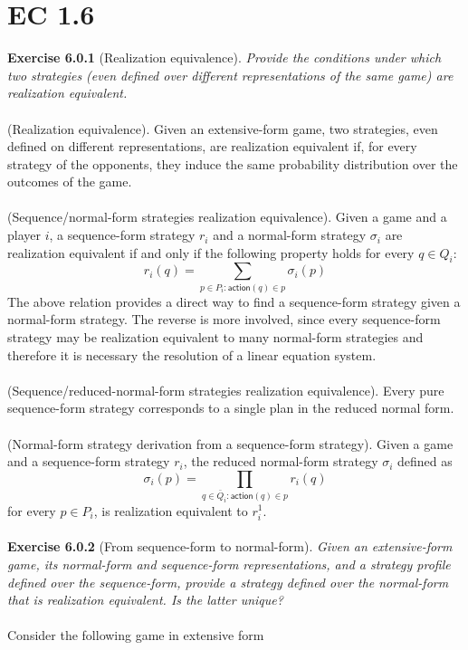 \section{EC 1.6}
\textbf{Exercise 6.0.1} (Realization equivalence). \textit{Provide the conditions under which two strategies (even defined over
different representations of the same game) are realization equivalent.}\\\\
(Realization equivalence). Given an extensive-form game, two strategies, even defined on different
representations, are realization equivalent if, for every strategy of the opponents, they induce the same probability
distribution over the outcomes of the game.\\\\
(Sequence/normal-form strategies realization equivalence). Given a game and a player $i$, a sequence-form strategy $r_i$ and a normal-form strategy $\sigma_i$ are realization equivalent if and only if the following property holds for every $q \in Q_i$:
$$ r_{i}(q) = \sum_{p \in P_i:\mathsf{action}(q) \in p} \sigma_{i}(p) $$
The above relation provides a direct way to find a sequence-form strategy given a normal-form strategy. The reverse is more involved, since every sequence-form strategy may be realization equivalent to many normal-form strategies and therefore it is necessary the resolution of a linear equation system.\\\\
(Sequence/reduced-normal-form strategies realization equivalence). Every pure sequence-form strategy corresponds to a single plan in the reduced normal form.\\\\
(Normal-form strategy derivation from a sequence-form strategy). Given a game and a sequence-form strategy $r_{i}$, the reduced normal-form strategy $\sigma_{i}$ defined as
$$
\sigma_{i}(p)=\prod_{q \in \bar{Q}_{i}: \textsf{action}(q) \in p} r_{i}(q)
$$
for every $p \in P_{i}$, is realization equivalent to $r_{i}^{1}$.\\\\
\textbf{Exercise 6.0.2} (From sequence-form to normal-form). \textit{Given an extensive-form game, its normal-form and sequence-form representations, and a strategy profile defined over the sequence-form, provide a strategy defined over the normal-form that is realization equivalent. Is the latter unique?}\\\\
Consider the following game in extensive form
